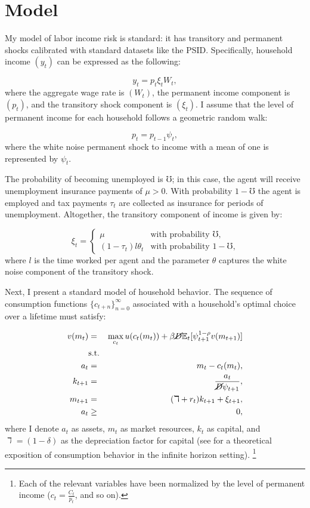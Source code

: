 \documentclass[\econtexRoot/Chp1proposal]{subfiles}
\begin{document}
\onlyinsubfile{\setcounter{section}{2}}
\section{Model}
\notinsubfile{\label{sec:Model}}

\par My model of labor income risk is standard: it has transitory and permanent shocks calibrated with standard datasets like the PSID. Specifically, household income $(y_t)$ can be expressed as the following:

$$ y_t = p_t \xi_t W_t, $$
where the aggregate wage rate is $(W_t)$, the permanent income component is $(p_t)$, and the transitory shock component is $(\xi_t)$. I assume that the level of permanent income for each household follows a geometric random walk:

$$ p_t = p_{t-1} \psi_{t}, $$
where the white noise permanent shock to income with a mean of one is represented by $\psi_t$.

\par The probability of becoming unemployed is $\mho$; in this case, the agent will receive unemployment insurance payments of $\mu > 0$. With probability $1 - \mho$ the agent is employed and tax payments $\tau_t$ are collected as insurance for periods of unemployment. Altogether, the transitory component of income is given by:

\begin{equation*}
\xi_t =
    \begin{cases}
        \mu & \text{with probability $\mho$,} \\
        (1-\tau_t) l \theta_t & \text{with probability $1-\mho$,}
    \end{cases}
\end{equation*}
where $l$ is the time worked per agent and the parameter $\theta$ captures the white noise component of the transitory shock.

\par Next, I present a standard model of household behavior. The sequence of consumption functions $\{c_{t+n}\}^{\infty}_{n=0}$ associated with a household's optimal choice over a lifetime must satisfy:

\begin{eqnarray*}
  v(m_t) &=& \max_{c_t} u(c_t(m_t)) + \beta \cancel{D} \mathbb{E}_{t}[\psi_{t+1}^{1-\rho}v(m_{t+1})] \\
  &\text{s.t.}& \\
  a_t &=& m_t - c_t(m_t), \\
  k_{t+1} &=& \frac{a_t}{\cancel{D}\psi_{t+1}}, \\
  m_{t+1} &=& (\daleth + r_t)k_{t+1} + \xi_{t+1}, \\
  a_t &\geq& 0,
\end{eqnarray*}
where I denote $a_t$ as assets, $m_t$ as market resources, $k_t$ as capital, and $\daleth = (1 - \delta)$ as the depreciation factor for capital (see \cite{Carroll2019bst} for a theoretical exposition of consumption behavior in the infinite horizon setting). \footnote{Each of the relevant variables have been normalized by the level of permanent income ($c_t = \frac{C_t}{p_t}$, and so on).}
\end{document}
